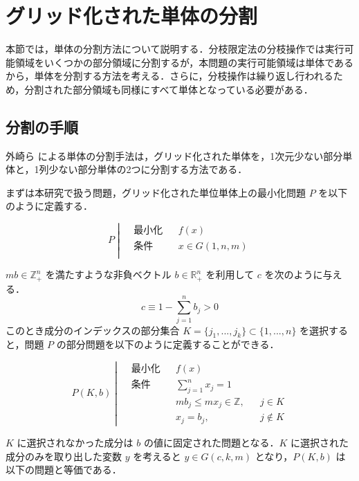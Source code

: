 \documentclass[a4paper,11pt]{jreport}
\begin{document}
\section{グリッド化された単体の分割} \label{sec:partition}

本節では，単体の分割方法について説明する．分枝限定法の分枝操作では実行可能領域をいくつかの部分領域に分割するが，本問題の実行可能領域は単体であるから，単体を分割する方法を考える．さらに，分枝操作は繰り返し行われるため，分割された部分領域も同様にすべて単体となっている必要がある．\par

\subsection{分割の手順}

外崎ら \cite{tonosaki} による単体の分割手法は，グリッド化された単体を，1次元少ない部分単体と，1列少ない部分単体の2つに分割する方法である．\par
まずは本研究で扱う問題，グリッド化された単位単体上の最小化問題 $ P $ を以下のように定義する．

$$
P \;
\left| \;
\begin{aligned}
& 最小化 && f(x) \\
& 条件 && x \in G(1, n, m) \\
\end{aligned}
\right.
$$

$ mb \in \mathbb{Z}_+^n $ を満たすような非負ベクトル $ b \in \mathbb{R}^n_{+} $ を利用して $ c $ を次のように与える．
$$ c \equiv 1 - \sum_{j=1}^{n} b_j > 0 $$
このとき成分のインデックスの部分集合 $ K = \{j_1, ..., j_k\} \subset \{1, ..., n\} $ を選択すると，問題 $ P $ の部分問題を以下のように定義することができる．\par

$$
P(K, b) \;
\left| \;
\begin{aligned}
& 最小化 && f(x) \\
& 条件 && \sum_{j = 1}^n x_j = 1 \\
& && mb_j \leq mx_j \in \mathbb{Z}, && j \in K \\
& && x_j = b_j, && j \not \in K
\end{aligned}
\right.
$$

$ K $ に選択されなかった成分は $ b $ の値に固定された問題となる．$ K $ に選択された成分のみを取り出した変数 $ y $ を考えると $ y \in G(c, k, m) $ となり，$ P(K, b) $ は以下の問題と等価である．\par
\end{document}
